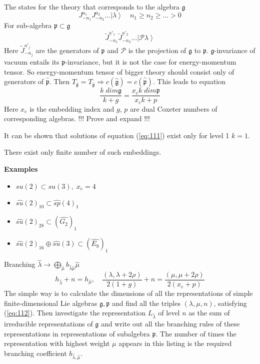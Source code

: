 \documentclass[a4paper,12pt]{article}
\theoremstyle{definition} \newtheorem{Def}{Definition}
\begin{document}
The states for the theory that corresponds to the algebra $\mathfrak{g}$
\begin{equation}
  \label{eq:109}
  J^{a_1}_{-n_1}J^{a_2}_{-n_2}\dots\left|\lambda\right>\quad n_1\geq n_2\geq\dots>0
\end{equation}
For sub-algebra $\mathfrak{p}\subset\mathfrak{g}$
\begin{equation}
  \label{eq:110}
  \tilde{J}^{a'_1}_{-n_1}\tilde{J}^{a'_2}_{-n_2}\dots\left|\mathcal{P}\lambda\right>
\end{equation}
Here $\tilde{J}^{a'_j}_{-n_j}$ are the generators of $\mathfrak{p}$ and $\mathcal{P}$ is the projection of $\mathfrak{g}$ to $\mathfrak{p}$. $\mathfrak{g}$-invariance of vacuum entails its $\mathfrak{p}$-invariance, but it is not the case for energy-momentum tensor. So energy-momentum tensor of bigger theory should consist only of generators of $\hat{\mathfrak{p}}$. Then $T_{\hat{\mathfrak{g}}}=T_{\hat{\mathfrak{p}}}\Rightarrow c(\hat{\mathfrak{g}})=c(\hat{\mathfrak{p}})$. This leads to equation
\begin{equation}
  \label{eq:111}
  \frac{k\;dim\mathfrak{g}}{k+g}=\frac{x_e k\; dim\mathfrak{p}}{x_ek+p}
\end{equation}
Here $x_e$ is the embedding index and $g$, $p$ are dual Coxeter numbers of corresponding algebras. !!! Prove and expand !!!

It can be shown that solutions of equation (\ref{eq:111}) exist only for level 1 $k=1$.

There exist only finite number of such embeddings.

{\bf Examples}
\begin{itemize}
\item $su(2)\subset su(3),\; x_e=4$
\item $\hat{su}(2)_{10}\subset\hat{sp}(4)_1$
\item $\hat{su}(2)_{28}\subset(\hat{G_2})_1$
\item $\hat{su}(2)_{16}\oplus\hat{su}(3)\subset (\hat{E_8})_1$
\end{itemize}

Branching $\hat{\lambda}\to \bigoplus_{\hat{\mu}}b_{\hat{\lambda}\hat{\mu}}\hat{\mu}$
\begin{equation}
  \label{eq:112}
  h_{\hat{\lambda}}+n=h_{\hat{\mu}},\quad \frac{(\lambda,\lambda+2\rho)}{2(1+g)}+n=\frac{(\mu,\mu+2\rho)}{2(x_e+p)}
\end{equation}
The simple way is to calculate the dimensions of all the representations of simple finite-dimensional Lie algebras $\mathfrak{g},\mathfrak{p}$ and find all the triples $(\lambda,\mu,n)$, satisfying (\ref{eq:112}). Then investigate the representation $L_{\hat{\lambda}}$ of level $n$ as the sum of irreducible representations of $\mathfrak{g}$ and write out all the branching rules of these representations in representations of subalgebra $\mathfrak{p}$. The number of times the representation with highest weight $\mu$ appears in this listing is the required branching coefficient $b_{\hat{\lambda},\hat{\mu}}$.
\end{document}
